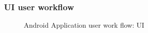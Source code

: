 \subsubsection{UI user workflow}
\begin{figure}[H]
\centering	
{}
\caption{Android Application user work flow: UI}
\end{figure}


